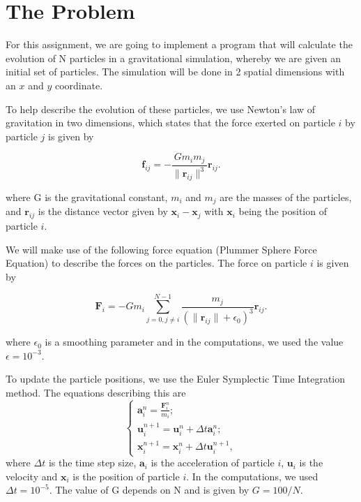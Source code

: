 \section{The Problem}
For this assignment, we are going to implement a program that will calculate the evolution of N particles in a gravitational simulation, whereby we are given an initial set of particles. The simulation will be done in 2 spatial dimensions with an $x$ and $y$ coordinate.

To help describe the evolution of these particles, we use Newton's law of gravitation in two dimensions, which states that the force exerted on particle $i$ by particle $j$ is given by

    $$\boldsymbol{f}_{ij} = -\frac{Gm_{i}m_{j}}{\|\boldsymbol{r}_{ij}\|^{3}}\boldsymbol{r}_{ij}.$$

where G is the gravitational constant, $m_{i}$ and $m_{j}$ are the masses of the particles, and $\boldsymbol{r}_{ij}$ is the distance vector given by $\boldsymbol{x}_{i} -\boldsymbol{x}_{j}$ with $\boldsymbol{x}_{i}$ being the position of particle $i$.

We will make use of the following force equation (Plummer Sphere Force Equation) to describe the forces on the particles. The force on particle $i$ is given by

    $$\boldsymbol{F}_{i} = -Gm_{i}\sum_{j = 0, j \neq i}^{N-1}\frac{m_{j}}{(\|\boldsymbol{r}_{ij}\| + \epsilon_{0})^{3}}\boldsymbol{r}_{ij}.$$

where $\epsilon_{0}$ is a smoothing parameter and in the computations, we used the value $\epsilon = 10^{-3}$.

To update the particle positions, we use the Euler Symplectic Time Integration method. The equations describing this are
$$
\begin{cases}
    \boldsymbol{a}_{i}^{n} = \frac{\boldsymbol{F}_{i}^{n}}{m_{i}};
    \\
    \boldsymbol{u}_{i}^{n+1} = \boldsymbol{u}_{i}^{n} + \Delta t\boldsymbol{a}_{i}^{n};
    \\
    \boldsymbol{x}_{i}^{n+1} = \boldsymbol{x}_{i}^{n} + \Delta t\boldsymbol{u}_{i}^{n+1},
\end{cases}
$$
where $\Delta t$ is the time step size, $\boldsymbol{a}_{i}$ is the acceleration of particle $i$, $\boldsymbol{u}_{i}$ is the velocity and $\boldsymbol{x}_{i}$ is the position of particle $i$. In the computations, we used $\Delta t = 10^{-5}$. The value of G depends on N and is given by $G = 100/N$.
\newpage
